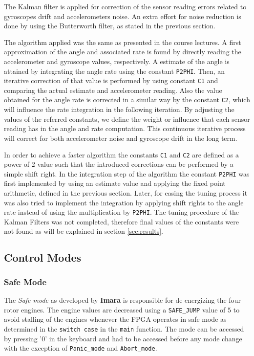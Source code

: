 \documentclass{article}
\begin{document}
The Kalman filter is applied for correction of the sensor reading errors related to gyroscopes drift and accelerometers noise. An extra effort for noise reduction is done by using the Butterworth filter, as stated in the previous section.

The algorithm applied was the same as presented in the course lectures. A first approximation of the angle and associated rate is found by directly reading the accelerometer and gyroscope values, respectively. A estimate of the angle is attained by integrating the angle rate using the constant \texttt{P2PHI}. Then, an iterative correction of that value is performed by using constant \texttt{C1} and comparing the actual estimate and accelerometer reading. Also the value obtained for the angle rate is corrected in a similar way by the constant \texttt{C2}, which will influence the rate integration in the following iteration. By adjusting the values of the referred constants, we define the weight or influence that each sensor reading has in the angle and rate computation. This continuous iterative process will correct for both accelerometer noise and gyroscope drift in the long term.

In order to achieve a faster algorithm the constants \texttt{C1} and \texttt{C2} are defined as a power of $2$ value such that the introduced corrections can be performed by a simple shift right. In the integration step of the algorithm the constant \texttt{P2PHI} was first implemented by using an estimate value and applying the fixed point arithmetic, defined in the previous section. Later, for easing the tuning process it was also tried to implement the integration by applying shift rights to the angle rate instead of using the multiplication by \texttt{P2PHI}. The tuning procedure of the Kalman Filters was not completed, therefore final values of the constants were not found as will be explained in section \ref{sec:results}.


\subsection{Control Modes}

\subsubsection{Safe Mode}
\label{sec:safemode}
The \textit{Safe mode} as developed by \textbf{Imara} is responsible for de-energizing the four rotor engines. The engine values are decreased using a \texttt{SAFE\_JUMP} value of 5 to avoid stalling of the engines whenever the FPGA operates in safe mode as determined in the \texttt{switch case} in the \texttt{main} function. The mode can be accessed by pressing '$0$' in the keyboard and had to be accessed before any mode change with the exception of \texttt{Panic\_mode} and \texttt{Abort\_mode}.
\end{document}
